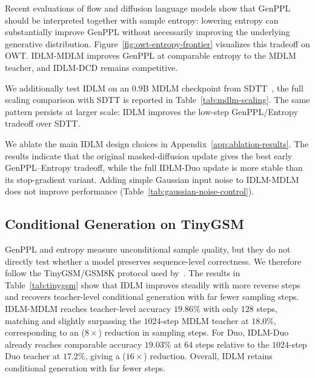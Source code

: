     Recent evaluations of flow and diffusion language models show that GenPPL should be interpreted together with sample entropy: lowering entropy can substantially improve GenPPL without necessarily improving the underlying generative distribution. Figure~\ref{fig:owt-entropy-frontier} visualizes this tradeoff on OWT. IDLM-MDLM improves GenPPL at comparable entropy to the MDLM teacher, and IDLM-DCD remains competitive.

    We additionally test IDLM on an $0.9$B MDLM checkpoint from SDTT~\citep{deschenaux2024beyond}, the full scaling comparison with SDTT is reported in Table~\ref{tab:mdlm-scaling}. The same pattern persists at larger scale: IDLM improves the low-step GenPPL/Entropy tradeoff over SDTT.

\label{sec:ablation}
    We ablate the main IDLM design choices in Appendix~\ref{app:ablation-results}. The results indicate that the original masked-diffusion update gives the best early GenPPL--Entropy tradeoff, while the full IDLM-Duo update is more stable than its stop-gradient variant. Adding simple Gaussian input noise to IDLM-MDLM does not improve performance (Table~\ref{tab:gaussian-noise-control}).

\subsection{Conditional Generation on TinyGSM}
\label{sec:tinygsm}

GenPPL and entropy measure unconditional sample quality, but they do not directly test whether a model preserves sequence-level correctness. We therefore follow the TinyGSM/GSM8K protocol used by~\citet{deschenaux2026language}. The results in Table~\ref{tab:tinygsm} show that IDLM improves steadily with more reverse steps and recovers teacher-level conditional generation with far fewer sampling steps. IDLM-MDLM reaches teacher-level accuracy $19.86\%$ with only $128$ steps, matching and slightly surpassing the $1024$-step MDLM teacher at $18.0\%$, corresponding to an ($8\times$) reduction in sampling steps. For Duo, IDLM-Duo already reaches comparable accuracy $19.03\%$ at $64$ steps relative to the $1024$-step Duo teacher at $17.2\%$, giving a ($16\times$) reduction. Overall, IDLM retains conditional generation with far fewer steps.

